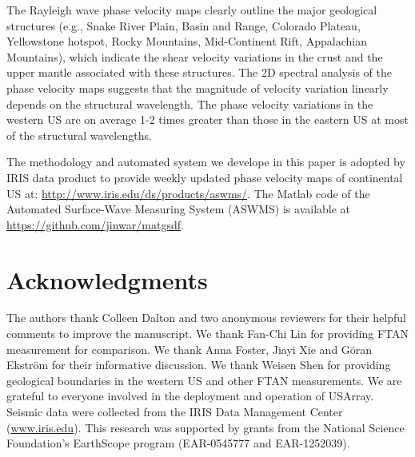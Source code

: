 The Rayleigh wave phase velocity maps clearly outline the major geological structures (e.g., Snake River Plain, Basin and Range, Colorado Plateau, Yellowstone hotspot, Rocky Mountains, Mid-Continent Rift, Appalachian Mountains), which indicate the shear velocity variations in the crust and the upper mantle associated with these structures. The 2D spectral analysis of the phase velocity maps suggests that the magnitude of velocity variation linearly depends on the structural wavelength. The phase velocity variations in the western US are on average 1-2 times greater than those in the eastern US at most of the structural wavelengths.

The methodology and automated system we develope in this paper is adopted by IRIS data product to provide weekly updated phase velocity maps of continental US at: \url{http://www.iris.edu/ds/products/aswms/}. The Matlab code of the Automated Surface-Wave Measuring System (ASWMS) is available at \url{https://github.com/jinwar/matgsdf}.



\section*{Acknowledgments}
	The authors thank Colleen Dalton and two anonymous reviewers for their helpful comments to improve the manuscript. We thank Fan-Chi Lin for providing FTAN measurement for comparison. We thank Anna Foster, Jiayi Xie and G\"oran Ekstr\"om for their informative discussion. We thank Weisen Shen for providing geological boundaries in the western US and other FTAN measurements. We are grateful to everyone involved in the deployment and operation of USArray. Seismic data were collected from the IRIS Data Management Center (\url{www.iris.edu}). This research was supported by grants from the National Science Foundation's EarthScope program (EAR-0545777 and EAR-1252039).

\pagebreak









